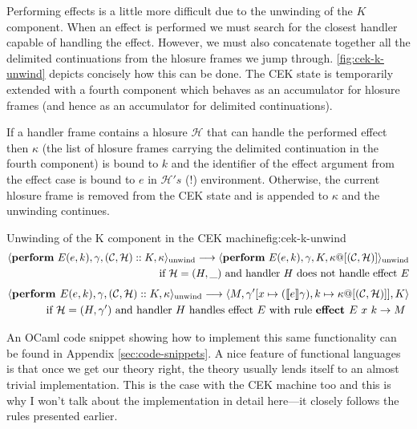 \documentclass[class=article, crop=false]{standalone}
\begin{document}
Performing effects is a little more difficult due to the unwinding of the $K$ component. When
an effect is performed we must search for the closest handler capable of handling the effect.
However, we must also concatenate together all the delimited continuations from the hlosure frames
we jump through. \autoref{fig:cek-k-unwind} depicts concisely how this can be done. The CEK state
is temporarily extended with a fourth component which behaves as an accumulator for hlosure
frames (and hence as an accumulator for delimited continuations).

If a handler frame contains a hlosure $\mathcal{H}$ that can handle the performed effect then $\kappa$ (the list of
hlosure frames carrying the delimited continuation in the fourth component) is bound to $k$ and the
identifier of the effect argument from the effect case is bound to $e$ in $\mathcal{H}'s$ (!) environment.
Otherwise, the current hlosure frame is removed from the CEK state and is appended to $\kappa$ and the unwinding
continues.

\begin{myfigure}[.95]{Unwinding of the K component in the CEK machine}{fig:cek-k-unwind}
    \begin{align*}
        \cek{ \effPerform E(e,k), \gamma, (\konts, \hlosure) :: K, \kappa}_\text{unwind} \longrightarrow
        \cek{ \effPerform E(e,k), \gamma, K, \kappa@[(\konts, \hlosure)] }_\text{unwind} \\
        \text{ if $\hlosure = (H, \_)$ and handler $H$ does not handle effect $E$}
        \end{align*}
        \begin{align*}
        \langle  \textbf{perform } E(e,k), \gamma, (\mathcal{C}, \mathcal{H}) :: K, \kappa \rangle_\text{unwind} \longrightarrow
        \langle  M, \gamma' [x \mapsto (\llbracket e \rrbracket\gamma), k \mapsto \kappa @ [(\mathcal{C}, \mathcal{H})]], K \rangle \\
        \text{ if $\mathcal{H} = (H, \gamma')$ and handler $H$ handles effect $E$ with rule $\textbf{effect } E\ x \ k \to M$ }
        \end{align*}
\end{myfigure}

An OCaml code snippet showing how to implement this same functionality can be found in Appendix \autoref{sec:code-snippets}.
A nice feature of functional languages is that once we get our theory right, the theory usually lends
itself to an almost trivial implementation. This is the case with the CEK machine too and this is why
I won't talk about the implementation in detail here---it closely follows the rules presented earlier.
\end{document}
